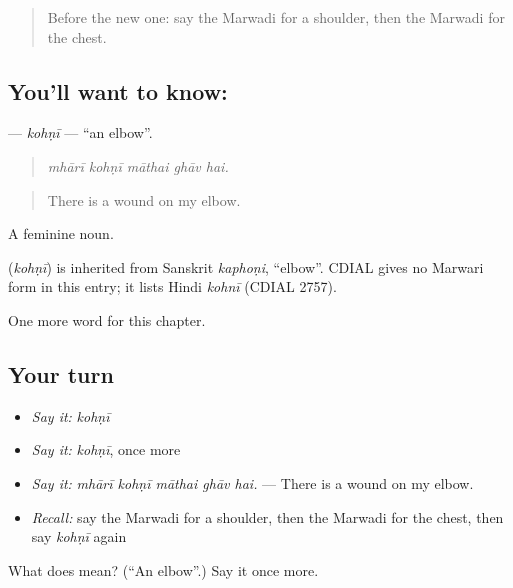 \begin{quote}
Before the new one: say the Marwadi for a shoulder, then the Marwadi for the chest.
\end{quote}

\subsection*{You'll want to know: }
\textbf{} — \emph{kohṇī} — \textquotedblleft{}an elbow\textquotedblright{}.

\begin{quote}
    
\end{quote}

\begin{quote}
\emph{mhārī kohṇī māthai ghāv hai.}
\end{quote}

\begin{quote}
There is a wound on my elbow.
\end{quote}

A feminine noun.

\begin{cousinweb}
\textbf{} (\emph{kohṇī}) is inherited from Sanskrit \emph{kaphoṇi}, \textquotedblleft{}elbow\textquotedblright{}. CDIAL gives no Marwari form in this entry; it lists Hindi \emph{kohnī} (CDIAL 2757).
\end{cousinweb}

\begin{grammarlens}[title={What you've built}]
One more word for this chapter.
\end{grammarlens}

\subsection*{Your turn}
\begin{itemize}
\raggedright
  \item \emph{Say it:} \emph{kohṇī}
  \item \emph{Say it:} \emph{kohṇī}, once more
  \item \emph{Say it:} \emph{mhārī kohṇī māthai ghāv hai.} — There is a wound on my elbow.
  \item \emph{Recall:} say the Marwadi for a shoulder, then the Marwadi for the chest, then say \emph{kohṇī} again
\end{itemize}

\begin{tcolorbox}[breakable,colback=teal!4,colframe=teal!35!black,title={Before you move on}]
What does  mean? (\textquotedblleft{}An elbow\textquotedblright{}.) Say it once more.
\end{tcolorbox}
